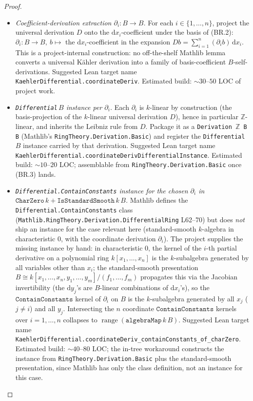 \begin{proof}
\begin{itemize}
    \item[(BR.3)] \emph{Coefficient-derivation extraction \(\partial_i \colon B \to B\).} For each \(i \in \{1, \ldots, n\}\), project the universal derivation \(D\) onto the \(\mathrm dx_i\)-coefficient under the basis of (BR.2): \(\partial_i \colon B \to B,\ b \mapsto\) the \(\mathrm dx_i\)-coefficient in the expansion \(D b = \sum_{i = 1}^{n} (\partial_i b)\, \mathrm dx_i\). This is a project-internal construction: no off-the-shelf Mathlib lemma converts a universal K\"ahler derivation into a family of basis-coefficient \(B\)-self-derivations. Suggested Lean target name \texttt{KaehlerDifferential.coordinateDeriv}. Estimated build: \(\sim 30\)--\(50\) LOC of project work.
    \item[(BR.4)] \emph{\texttt{Differential}\,\(B\) instance per \(\partial_i\).} Each \(\partial_i\) is \(k\)-linear by construction (the basis-projection of the \(k\)-linear universal derivation \(D\)), hence in particular \(\mathbb Z\)-linear, and inherits the Leibniz rule from \(D\). Package it as a \texttt{Derivation \(\mathbb Z\) B B} (Mathlib's \texttt{RingTheory.Derivation.Basic}) and register the \texttt{Differential}\,\(B\) instance carried by that derivation. Suggested Lean target name \texttt{KaehlerDifferential.coordinateDerivDifferentialInstance}. Estimated build: \(\sim 10\)--\(20\) LOC; assemblable from \texttt{RingTheory.Derivation.Basic} once (BR.3) lands.
    \item[(BR.5)] \emph{\texttt{Differential.ContainConstants} instance for the chosen \(\partial_i\) in \(\mathtt{CharZero}\,k + \mathtt{IsStandardSmooth}\,k\,B\).} Mathlib defines the \texttt{Differential.ContainConstants} class (\texttt{Mathlib.RingTheory.Derivation.DifferentialRing} L62--70) but does \emph{not} ship an instance for the case relevant here (standard-smooth \(k\)-algebra in characteristic \(0\), with the coordinate derivation \(\partial_i\)). The project supplies the missing instance by hand: in characteristic \(0\), the kernel of the \(i\)-th partial derivative on a polynomial ring \(k[x_1, \ldots, x_n]\) is the \(k\)-subalgebra generated by all variables other than \(x_i\); the standard-smooth presentation \(B \cong k[x_1, \ldots, x_n, y_1, \ldots, y_m] / (f_1, \ldots, f_m)\) propagates this via the Jacobian invertibility (the \(\mathrm dy_j\)'s are \(B\)-linear combinations of \(\mathrm dx_i\)'s), so the \(\mathtt{ContainConstants}\) kernel of \(\partial_i\) on \(B\) is the \(k\)-subalgebra generated by all \(x_j\) (\(j \neq i\)) and all \(y_j\). Intersecting the \(n\) coordinate \(\mathtt{ContainConstants}\) kernels over \(i = 1, \ldots, n\) collapses to \(\operatorname{range}(\mathtt{algebraMap}\,k\,B)\). Suggested Lean target name \texttt{KaehlerDifferential.coordinateDeriv\_containConstants\_of\_charZero}. Estimated build: \(\sim 40\)--\(80\) LOC; the in-tree workaround constructs the instance from \texttt{RingTheory.Derivation.Basic} plus the standard-smooth presentation, since Mathlib has only the class definition, not an instance for this case.

\end{itemize}
\end{proof}
